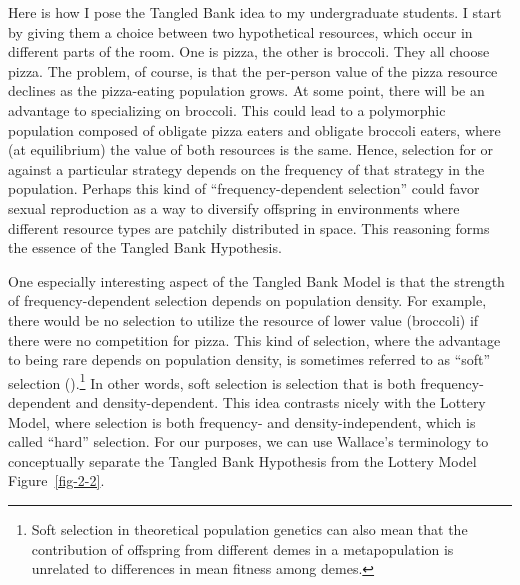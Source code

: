 \documentclass[
  american,
  letterpaper,
]{book}
\begin{document}
Here is how I pose the Tangled Bank idea to my undergraduate students. I
start by giving them a choice between two hypothetical resources, which
occur in different parts of the room. One is pizza, the other is
broccoli. They all choose pizza. The problem, of course, is that the
per-person value of the pizza resource declines as the pizza-eating
population grows. At some point, there will be an advantage to
specializing on broccoli. This could lead to a polymorphic population
composed of obligate pizza eaters and obligate broccoli eaters, where
(at equilibrium) the value of both resources is the same. Hence,
selection for or against a particular strategy depends on the frequency
of that strategy in the population. Perhaps this kind of
``frequency-dependent selection'' could favor sexual reproduction as a
way to diversify offspring in environments where different resource
types are patchily distributed in space. This reasoning forms the
essence of the Tangled Bank Hypothesis.

One especially interesting aspect of the Tangled Bank Model is that the
strength of frequency-dependent selection depends on population density.
For example, there would be no selection to utilize the resource of
lower value (broccoli) if there were no competition for pizza. This kind
of selection, where the advantage to being rare depends on population
density, is sometimes referred to as ``soft'' selection
().\footnote{Soft selection in
  theoretical population genetics can also mean that the contribution of
  offspring from different demes in a metapopulation is unrelated to
  differences in mean fitness among demes.} In other words, soft
selection is selection that is both frequency-dependent and
density-dependent. This idea contrasts nicely with the Lottery Model,
where selection is both frequency- and density-independent, which is
called ``hard'' selection. For our purposes, we can use Wallace's
terminology to conceptually separate the Tangled Bank Hypothesis from
the Lottery Model Figure~\ref{fig-2-2}.
\end{document}

